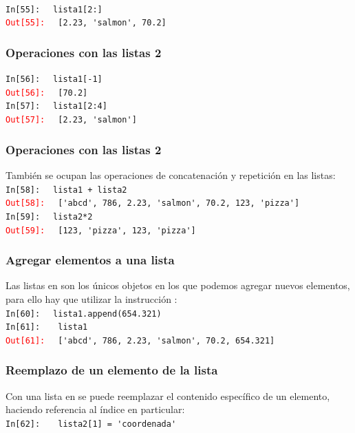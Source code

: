 {\begin{frame}[fragile]
\\
\bigskip
\textcolor{ao}{\texttt{In[55]: }} \verb| lista1[2:]|
\\
\pause
\textcolor{red}{\texttt{Out[55]: }} \verb| [2.23, 'salmon', 70.2]|
\end{frame}
\begin{frame}[fragile]
\frametitle{Operaciones con las listas 2}
\textcolor{ao}{\texttt{In[56]: }} \verb| lista1[-1]|
\\
\pause
\textcolor{red}{\texttt{Out[56]: }} \verb| [70.2]|
\\
\bigskip
\pause
\textcolor{ao}{\texttt{In[57]: }} \verb| lista1[2:4]|
\\
\pause
\textcolor{red}{\texttt{Out[57]: }} \verb| [2.23, 'salmon']|
\end{frame}
\begin{frame}[fragile]
\frametitle{Operaciones con las listas 2}
También se ocupan las operaciones de concatenación y repetición en las listas:
\\
\bigskip
\textcolor{ao}{\texttt{In[58]: }} \verb| lista1 + lista2|
\\
\pause
\begingroup
\fontsize{13}{13}\selectfont
\textcolor{red}{\texttt{Out[58]: }} \verb| ['abcd', 786, 2.23, 'salmon', 70.2, 123, 'pizza']|
\endgroup
\\
\bigskip
\pause
\textcolor{ao}{\texttt{In[59]: }} \verb| lista2*2|
\\
\pause
\textcolor{red}{\texttt{Out[59]: }} \verb| [123, 'pizza', 123, 'pizza']|
\end{frame}
\begin{frame}[fragile]
\frametitle{Agregar elementos a una lista}
Las listas en \python{} son los únicos objetos en los que podemos agregar nuevos elementos, para ello hay que utilizar la instrucción :
\\
\bigskip
\textcolor{ao}{\texttt{In[60]: }} \verb| lista1.append(654.321)|
\\
\pause
\textcolor{ao}{\texttt{In[61]: }} \verb|  lista1|
\\
\pause
\textcolor{red}{\texttt{Out[61]: }} \verb| ['abcd', 786, 2.23, 'salmon', 70.2, 654.321]|
\end{frame}
\begin{frame}[fragile]
\frametitle{Reemplazo de un elemento de la lista}
Con una lista en \python{} se puede reemplazar el contenido específico de un elemento, haciendo referencia al índice en particular:
\\
\bigskip
\textcolor{ao}{\texttt{In[62]: }} \verb|  lista2[1] = 'coordenada'|

\end{frame}}
